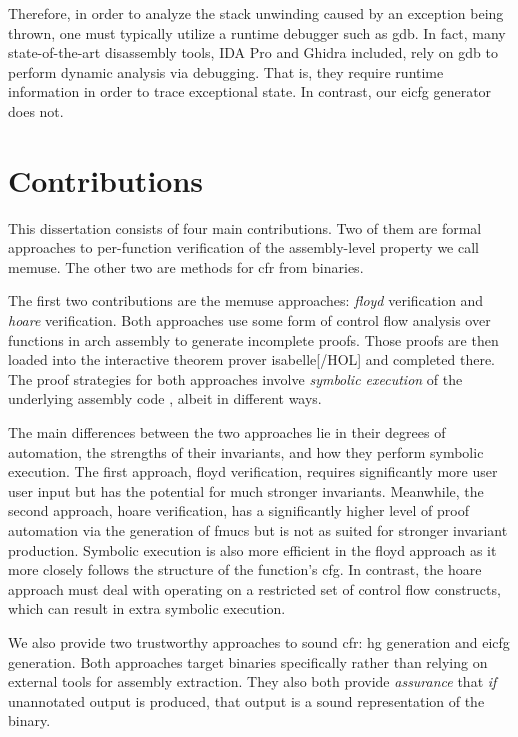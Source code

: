 Therefore, in order to analyze the stack unwinding caused by an exception being thrown, one must typically utilize a runtime debugger such as \gls{gdb}.
In fact, many state-of-the-art disassembly tools, IDA Pro and Ghidra included,
rely on \gls{gdb} to perform dynamic analysis via debugging.
That is, they require runtime information in order to trace exceptional state.
In contrast, our \gls{eicfg} generator does not.

\section{Contributions}
This dissertation consists of four main contributions.
Two of them are formal approaches to per-function verification of the assembly-level property we call \gls{memuse}.
The other two are methods for \gls{cfr} from binaries.

The first two contributions are the \gls{memuse} approaches: \emph{\gls{floyd}} verification and \emph{\gls{hoare}} verification.
Both approaches use some form of control flow analysis over functions in \gls{arch} assembly to generate incomplete proofs.
Those proofs are then loaded into the interactive theorem prover \gls{isabelle}[/HOL] \autocite{nipkow2002isabelle} and completed there.
The proof strategies for both approaches involve \emph{symbolic execution} of the underlying assembly code \autocite{king1976symbolic}, albeit in different ways.

The main differences between the two approaches lie in their degrees of automation, the strengths of their invariants, and how they perform symbolic execution.
The first approach, \gls{floyd} verification, requires significantly more user user input but has the potential for much stronger invariants.
Meanwhile, the second approach, \gls{hoare} verification, has a significantly higher level of proof automation via the generation of \glspl{fmuc} but is not as suited for stronger invariant production.
Symbolic execution is also more efficient in the \gls{floyd} approach as it more closely follows the structure of the function's \gls{cfg}.
In contrast, the \gls{hoare} approach must deal with operating on a restricted set of control flow constructs, which can result in extra symbolic execution.

We also provide two trustworthy approaches to sound \gls{cfr}: \gls{hg} generation and \gls{eicfg} generation.
Both approaches target binaries specifically rather than relying on external tools for assembly extraction.
They also both provide \emph{assurance} that \emph{if} unannotated output is produced, that output is a sound representation of the binary.

